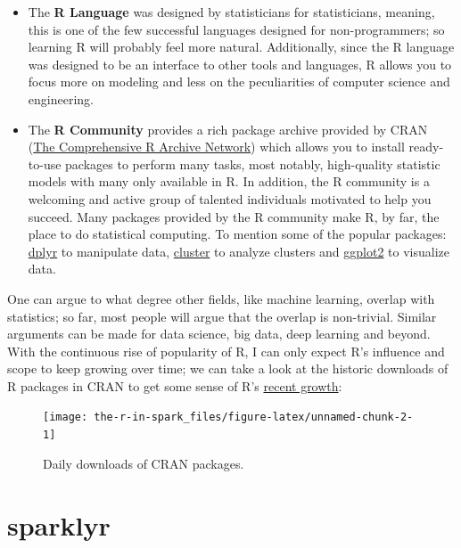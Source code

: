 \documentclass[]{book}
\providecommand{\tightlist}{%
  \setlength{\itemsep}{0pt}\setlength{\parskip}{0pt}}
\theoremstyle{definition}
\theoremstyle{definition}
\theoremstyle{definition}
\theoremstyle{remark}
\begin{document}
\begin{itemize}
\tightlist
\item
  The \textbf{R Language} was designed by statisticians for
  statisticians, meaning, this is one of the few successful languages
  designed for non-programmers; so learning R will probably feel more
  natural. Additionally, since the R language was designed to be an
  interface to other tools and languages, R allows you to focus more on
  modeling and less on the peculiarities of computer science and
  engineering.
\item
  The \textbf{R Community} provides a rich package archive provided by
  CRAN (\href{https://cran.r-project.org/}{The Comprehensive R Archive
  Network}) which allows you to install ready-to-use packages to perform
  many tasks, most notably, high-quality statistic models with many only
  available in R. In addition, the R community is a welcoming and active
  group of talented individuals motivated to help you succeed. Many
  packages provided by the R community make R, by far, the place to do
  statistical computing. To mention some of the popular packages:
  \href{https://CRAN.R-project.org/package=dplyr}{dplyr} to manipulate
  data, \href{https://CRAN.R-project.org/package=cluster}{cluster} to
  analyze clusters and
  \href{https://CRAN.R-project.org/package=ggplot2}{ggplot2} to
  visualize data.
\end{itemize}

One can argue to what degree other fields, like machine learning,
overlap with statistics; so far, most people will argue that the overlap
is non-trivial. Similar arguments can be made for data science, big
data, deep learning and beyond. With the continuous rise of popularity
of R, I can only expect R's influence and scope to keep growing over
time; we can take a look at the historic downloads of R packages in CRAN
to get some sense of R's \protect\hyperlink{cran-downloads}{recent
growth}:

\begin{figure}

{\centering \texttt{[image: the-r-in-spark\_files/figure-latex/unnamed-chunk-2-1]} 

}

\caption{Daily downloads of CRAN packages.}\label{fig:unnamed-chunk-2}
\end{figure}

\hypertarget{sparklyr}{%
\section{sparklyr}\label{sparklyr}}
\end{document}
